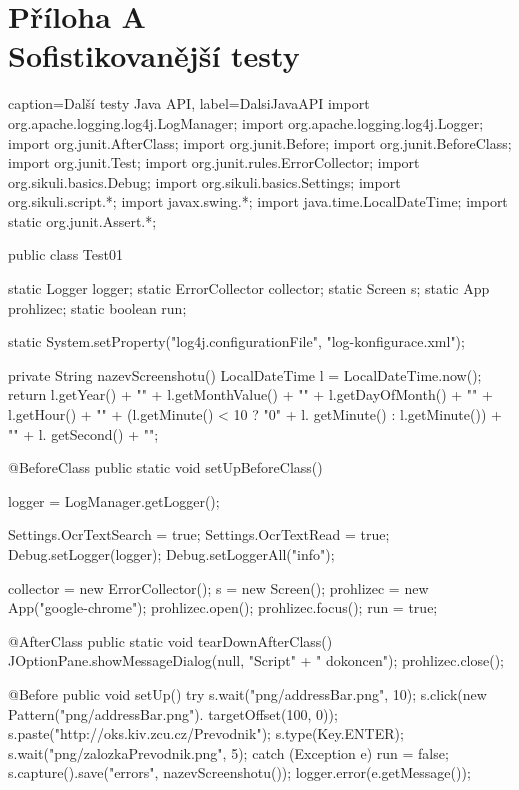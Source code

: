 \chapter*{Příloha A\\Sofistikovanější testy}

	\begin{lstjava}{caption={Další testy Java API}, label={DalsiJavaAPI}}
import org.apache.logging.log4j.LogManager;
import org.apache.logging.log4j.Logger;
import org.junit.AfterClass;
import org.junit.Before;
import org.junit.BeforeClass;
import org.junit.Test;
import org.junit.rules.ErrorCollector;
import org.sikuli.basics.Debug;
import org.sikuli.basics.Settings;
import org.sikuli.script.*;
import javax.swing.*;
import java.time.LocalDateTime;
import static org.junit.Assert.*;

public class Test01 {

  static Logger logger;
  static ErrorCollector collector;
  static Screen s;
  static App prohlizec;
  static boolean run;

  static {
    System.setProperty("log4j.configurationFile",
      "log-konfigurace.xml");
  }

  private String nazevScreenshotu() {
    LocalDateTime l = LocalDateTime.now();
      return l.getYear() + "" + l.getMonthValue() +
        "" + l.getDayOfMonth() + "" + l.getHour() +
        "" + (l.getMinute() < 10 ? "0" + l.
        getMinute() : l.getMinute()) + "" + l.
        getSecond() + "";
  }

  @BeforeClass
  public static void setUpBeforeClass() {
    logger = LogManager.getLogger();

    Settings.OcrTextSearch = true;
    Settings.OcrTextRead = true;
    Debug.setLogger(logger);
    Debug.setLoggerAll("info");

    collector = new ErrorCollector();
    s = new Screen();
    prohlizec = new App("google-chrome");
    prohlizec.open();
    prohlizec.focus();
    run = true;
    }

  @AfterClass
  public static void tearDownAfterClass() {
    JOptionPane.showMessageDialog(null, "Script" +
      " dokoncen");
    prohlizec.close();
  }

  @Before
  public void setUp() {
    try {
      s.wait("png/addressBar.png", 10);
      s.click(new Pattern("png/addressBar.png").
        targetOffset(100, 0));
      s.paste("http://oks.kiv.zcu.cz/Prevodnik");
      s.type(Key.ENTER);
      s.wait("png/zalozkaPrevodnik.png", 5);
    } catch (Exception e) {
      run = false;
      s.capture().save("errors", nazevScreenshotu());
      logger.error(e.getMessage());
    }
  }

}
\end{lstjava}
